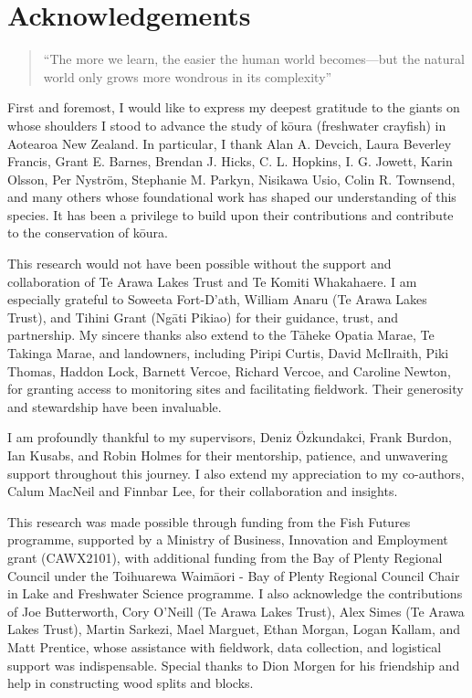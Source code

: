 \documentclass[
  12pt,
  a4paper,
  oneside]{scrbook}
\begin{document}

\chapter*{Acknowledgements}\label{acknowledgements}


\begin{quote}
``The more we learn, the easier the human world becomes---but the
natural world only grows more wondrous in its complexity''
\end{quote}

First and foremost, I would like to express my deepest gratitude to the
giants on whose shoulders I stood to advance the study of kōura
(freshwater crayfish) in Aotearoa New Zealand. In particular, I thank
Alan A. Devcich, Laura Beverley Francis, Grant E. Barnes, Brendan J.
Hicks, C. L. Hopkins, I. G. Jowett, Karin Olsson, Per Nyström, Stephanie
M. Parkyn, Nisikawa Usio, Colin R. Townsend, and many others whose
foundational work has shaped our understanding of this species. It has
been a privilege to build upon their contributions and contribute to the
conservation of kōura.

This research would not have been possible without the support and
collaboration of Te Arawa Lakes Trust and Te Komiti Whakahaere. I am
especially grateful to Soweeta Fort-D'ath, William Anaru (Te Arawa Lakes
Trust), and Tihini Grant (Ngāti Pikiao) for their guidance, trust, and
partnership. My sincere thanks also extend to the Tāheke Opatia Marae,
Te Takinga Marae, and landowners, including Piripi Curtis, David
McIlraith, Piki Thomas, Haddon Lock, Barnett Vercoe, Richard Vercoe, and
Caroline Newton, for granting access to monitoring sites and
facilitating fieldwork. Their generosity and stewardship have been
invaluable.

I am profoundly thankful to my supervisors, Deniz Özkundakci, Frank
Burdon, Ian Kusabs, and Robin Holmes for their mentorship, patience, and
unwavering support throughout this journey. I also extend my
appreciation to my co-authors, Calum MacNeil and Finnbar Lee, for their
collaboration and insights.

This research was made possible through funding from the Fish Futures
programme, supported by a Ministry of Business, Innovation and
Employment grant (CAWX2101), with additional funding from the Bay of
Plenty Regional Council under the Toihuarewa Waimāori - Bay of Plenty
Regional Council Chair in Lake and Freshwater Science programme. I also
acknowledge the contributions of Joe Butterworth, Cory O'Neill (Te Arawa
Lakes Trust), Alex Simes (Te Arawa Lakes Trust), Martin Sarkezi, Mael
Marguet, Ethan Morgan, Logan Kallam, and Matt Prentice, whose assistance
with fieldwork, data collection, and logistical support was
indispensable. Special thanks to Dion Morgen for his friendship and help
in constructing wood splits and blocks.
\end{document}
